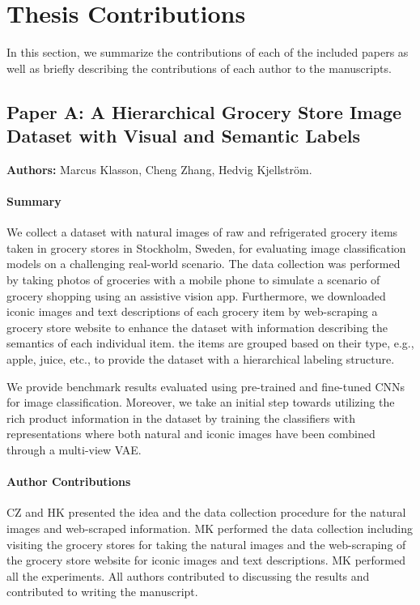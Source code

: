 
\section{Thesis Contributions}
\label{sec:contributions}

In this section, we summarize the contributions of each of the included papers as well as briefly describing the contributions of each author to the manuscripts. 

\subsection{Paper A: A Hierarchical Grocery Store Image Dataset with Visual and Semantic Labels}
\label{sec:paperA}

\textbf{Authors:} Marcus Klasson, Cheng Zhang, Hedvig Kjellström. 

\paragraph{Summary}
We collect a dataset with natural images of raw and refrigerated grocery items taken in grocery stores in Stockholm, Sweden, for evaluating image classification models on a challenging real-world scenario. The data collection was performed by taking photos of groceries with a mobile phone to simulate a scenario of grocery shopping using an assistive vision app. Furthermore, we downloaded iconic images and text descriptions of each grocery item by web-scraping a grocery store website to enhance the dataset with information describing the semantics of each individual item. the items are grouped based on their type, e.g., apple, juice, etc., to provide the dataset with a hierarchical labeling structure. 

We provide benchmark results evaluated using pre-trained and fine-tuned CNNs for image classification. Moreover, we take an initial step towards utilizing the rich product information in the dataset by training the classifiers with representations where both natural and iconic images have been combined through a multi-view VAE. 


\paragraph{Author Contributions}
CZ and HK presented the idea and the data collection procedure for the natural images and web-scraped information. MK performed the data collection including visiting the grocery stores for taking the natural images and the web-scraping of the grocery store website for iconic images and text descriptions. MK performed all the experiments. All authors contributed to discussing the results and contributed to writing the manuscript. 


